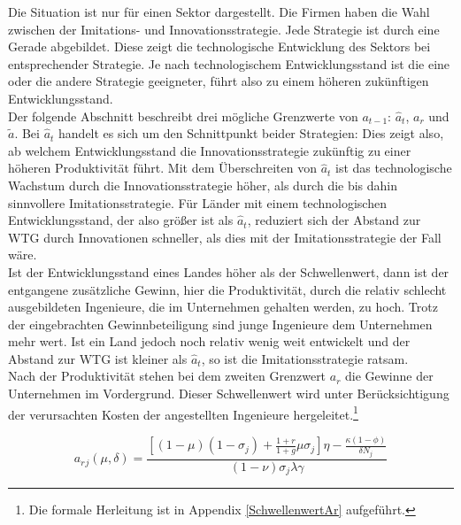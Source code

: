		
Die Situation ist nur für einen Sektor dargestellt. Die Firmen haben die Wahl zwischen der Imitations- und Innovationsstrategie. Jede Strategie ist durch eine Gerade abgebildet. Diese zeigt die technologische Entwicklung des Sektors bei entsprechender Strategie. Je nach technologischem Entwicklungsstand ist die eine oder die andere Strategie geeigneter, führt also zu einem höheren zukünftigen Entwicklungsstand.\\ 
Der folgende Abschnitt beschreibt drei mögliche Grenzwerte von $a_{t-1}$: $\hat{a}_t$, $a_r$ und $\tilde{a}$.  Bei $\hat{a}_t$ handelt es sich um den Schnittpunkt beider Strategien: Dies zeigt also, ab welchem Entwicklungsstand die Innovationsstrategie zukünftig zu einer höheren Produktivität führt.
Mit dem Überschreiten von $\hat{a}_t$ ist das technologische Wachstum durch die \textcolor[rgb]{0.74,0.97,0.22}{Innovationsstrategie} höher, als durch die bis dahin sinnvollere \textcolor[rgb]{0,0.32,0}{Imitationsstrategie}. 
Für Länder mit einem technologischen Entwicklungsstand, der also grö{\ss}er ist als $\hat{a}_t$, reduziert sich der Abstand zur WTG durch Innovationen schneller, als dies mit der \textcolor[rgb]{0,0.32,0}{Imitationsstrategie} der Fall wäre.\\
Ist der Entwicklungsstand eines Landes höher als der Schwellenwert, dann ist der entgangene zusätzliche Gewinn, hier die Produktivität, durch die relativ schlecht ausgebildeten Ingenieure, die im Unternehmen gehalten werden, zu hoch. Trotz der eingebrachten Gewinnbeteiligung sind junge Ingenieure dem Unternehmen mehr wert. Ist ein Land jedoch noch relativ wenig weit entwickelt und der Abstand zur WTG ist kleiner als $\hat{a}_t$, so ist die \textcolor[rgb]{0,0.32,0}{Imitationsstrategie} ratsam.\\
Nach der Produktivität stehen bei dem zweiten Grenzwert $a_r$ die Gewinne der Unternehmen im Vordergrund. Dieser Schwellenwert wird unter Berücksichtigung der verursachten Kosten der angestellten Ingenieure hergeleitet.\footnote{Die formale Herleitung ist in Appendix \ref{SchwellenwertAr} aufgeführt.}


	\begin{equation}
		a_r{_j}(\mu,\delta)=\frac{[(1-\mu)(1-\sigma_j)+\frac{1+r}{1+g}\mu\sigma_j]\eta-\frac{\kappa(1-\phi)}{\delta N_j}}{(1-\nu)\sigma_j\lambda\gamma} \label{Schwellenwert Kosten}
	\end{equation}


